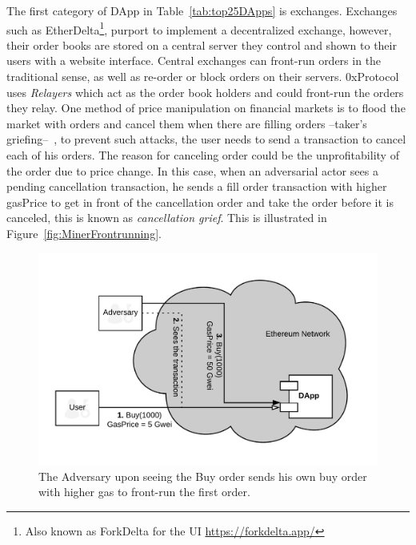 The first category of DApp in Table~\ref{tab:top25DApps} is exchanges. Exchanges such as EtherDelta\footnote{Also known as ForkDelta for the UI \url{https://forkdelta.app/}}, purport to implement a decentralized exchange, however, their order books are stored on a central server they control and shown to their users with a website interface. Central exchanges can front-run orders in the traditional sense, as well as re-order or block orders on their servers. 0xProtocol~\cite{warren20170x} uses \textit{Relayers} which act as the order book holders and could front-run the orders they relay. One method of price manipulation on financial markets is to flood the market with orders and cancel them when there are filling orders --taker's griefing--~\cite{consesnsys0xReview2017}, to prevent such attacks, the user needs to send a transaction to cancel each of his orders. The reason for canceling order could be the unprofitability of the order due to price change. In this case, when an adversarial actor sees a pending cancellation transaction, he sends a fill order transaction with higher gasPrice to get in front of the cancellation order and take the order before it is canceled, this is known as \textit{cancellation grief}. This is illustrated in Figure~\ref{fig:MinerFrontrunning}.

\begin{figure}[t]
\centering
\includegraphics[width=0.7\linewidth]{figures/Regular_frontrunning.png}
\caption{The Adversary upon seeing the Buy order sends his own buy order with higher gas to front-run the first order. \label{fig:RegularFrontrunning}}
\end{figure}


